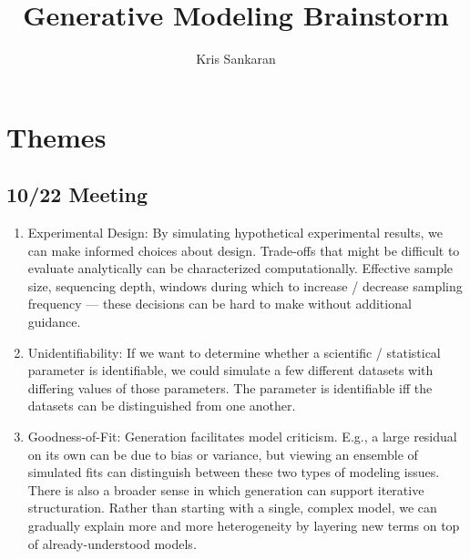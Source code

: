 \documentclass[]{article}
\title{Generative Modeling Brainstorm}
\author{Kris Sankaran}
\begin{document}
\maketitle

\section{Themes}

\subsection{10/22 Meeting}

\begin{enumerate}
\item Experimental Design: By simulating hypothetical experimental results, we can make informed choices about design. Trade-offs that might be difficult to evaluate analytically can be characterized computationally. Effective sample size, sequencing depth, windows during which to increase / decrease sampling frequency — these decisions can be hard to make without additional guidance.
\item Unidentifiability: If we want to determine whether a scientific / statistical parameter is identifiable, we could simulate a few different datasets with differing values of those parameters. The parameter is identifiable iff the datasets can be distinguished from one another.
\item Goodness-of-Fit: Generation facilitates model criticism. E.g., a large residual on its own can be due to bias or variance, but viewing an ensemble of simulated fits can distinguish between these two types of modeling issues. There is also a broader sense in which generation can support iterative structuration. Rather than starting with a single, complex model, we can gradually explain more and more heterogeneity by layering new terms on top of already-understood models.
\end{enumerate}
\end{document}
